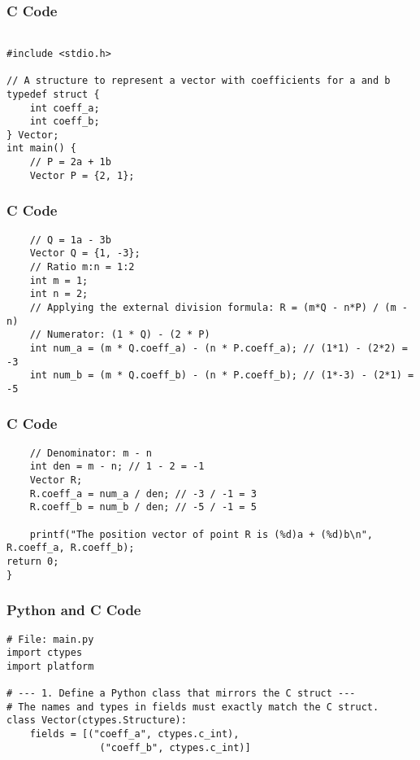 \documentclass{beamer}
\begin{document}
\begin{frame}[fragile]
\frametitle{C Code}
\begin{lstlisting}
  
#include <stdio.h>

// A structure to represent a vector with coefficients for a and b
typedef struct {
    int coeff_a;
    int coeff_b;
} Vector;
int main() {
    // P = 2a + 1b
    Vector P = {2, 1};
 \end{lstlisting}

\end{frame}   
\begin{frame}[fragile]
\frametitle{C Code}
\begin{lstlisting}
    // Q = 1a - 3b
    Vector Q = {1, -3};
    // Ratio m:n = 1:2
    int m = 1;
    int n = 2;
    // Applying the external division formula: R = (m*Q - n*P) / (m - n)
    // Numerator: (1 * Q) - (2 * P)
    int num_a = (m * Q.coeff_a) - (n * P.coeff_a); // (1*1) - (2*2) = -3
    int num_b = (m * Q.coeff_b) - (n * P.coeff_b); // (1*-3) - (2*1) = -5
 \end{lstlisting}

\end{frame}   
\begin{frame}[fragile]
\frametitle{C Code}
\begin{lstlisting}
    // Denominator: m - n
    int den = m - n; // 1 - 2 = -1
    Vector R;
    R.coeff_a = num_a / den; // -3 / -1 = 3
    R.coeff_b = num_b / den; // -5 / -1 = 5

    printf("The position vector of point R is (%d)a + (%d)b\n", R.coeff_a, R.coeff_b);
return 0;
}

\end{lstlisting}

\end{frame}


\begin{frame}[fragile]
\frametitle{Python and C Code}

\begin{lstlisting}
# File: main.py
import ctypes
import platform

# --- 1. Define a Python class that mirrors the C struct ---
# The names and types in fields must exactly match the C struct.
class Vector(ctypes.Structure):
    fields = [("coeff_a", ctypes.c_int),
                ("coeff_b", ctypes.c_int)]
\end{lstlisting}

\end{frame}
\end{document}
